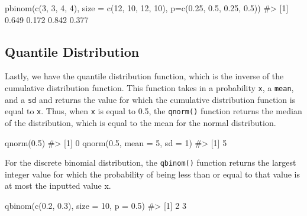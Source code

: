 \documentclass[
  letterpaper,
]{latex/krantz}
\makeatletter
\newenvironment{Shaded}{\begin{snugshade}}{\end{snugshade}}
\newcommand{\AttributeTok}[1]{\textcolor[rgb]{0.40,0.45,0.13}{#1}}
\newcommand{\CommentTok}[1]{\textcolor[rgb]{0.37,0.37,0.37}{#1}}
\newcommand{\DecValTok}[1]{\textcolor[rgb]{0.68,0.00,0.00}{#1}}
\newcommand{\FloatTok}[1]{\textcolor[rgb]{0.68,0.00,0.00}{#1}}
\newcommand{\FunctionTok}[1]{\textcolor[rgb]{0.28,0.35,0.67}{#1}}
\newcommand{\NormalTok}[1]{\textcolor[rgb]{0.00,0.23,0.31}{#1}}
\newenvironment{kframe}{%
\medskip{}
\setlength{\fboxsep}{.8em}
 \def\at@end@of@kframe{}%
 \ifinner\ifhmode%
  \def\at@end@of@kframe{\end{minipage}}%
  \begin{minipage}{\columnwidth}%
 \fi\fi%
 \def\FrameCommand##1{\hskip\@totalleftmargin \hskip-\fboxsep
 \colorbox{shadecolor}{##1}\hskip-\fboxsep
     \hskip-\linewidth \hskip-\@totalleftmargin \hskip\columnwidth}%
 \MakeFramed {\advance\hsize-\width
   \@totalleftmargin\z@ \linewidth\hsize
   \@setminipage}}%
 {\par\unskip\endMakeFramed%
 \at@end@of@kframe}
\renewenvironment{Shaded}{\begin{kframe}}{\end{kframe}}
\makeatother
\begin{document}
\begin{Shaded}
\begin{Highlighting}[]
\FunctionTok{pbinom}\NormalTok{(}\FunctionTok{c}\NormalTok{(}\DecValTok{3}\NormalTok{, }\DecValTok{3}\NormalTok{, }\DecValTok{4}\NormalTok{, }\DecValTok{4}\NormalTok{), }\AttributeTok{size =} \FunctionTok{c}\NormalTok{(}\DecValTok{12}\NormalTok{, }\DecValTok{10}\NormalTok{, }\DecValTok{12}\NormalTok{, }\DecValTok{10}\NormalTok{), }
       \AttributeTok{p=}\FunctionTok{c}\NormalTok{(}\FloatTok{0.25}\NormalTok{, }\FloatTok{0.5}\NormalTok{, }\FloatTok{0.25}\NormalTok{, }\FloatTok{0.5}\NormalTok{))}
\CommentTok{\#\textgreater{} [1] 0.649 0.172 0.842 0.377}
\end{Highlighting}
\end{Shaded}

\subsection{\texorpdfstring{Quantile Distribution
}{Quantile Distribution   }}\label{quantile-distribution}

Lastly, we have the quantile distribution function, which is the inverse
of the cumulative distribution function. This function takes in a
probability \texttt{x}, a \texttt{mean}, and a \texttt{sd} and returns
the value for which the cumulative distribution function is equal to
\texttt{x}. Thus, when \texttt{x} is equal to 0.5, the \texttt{qnorm()}
function returns the median of the distribution, which is equal to the
mean for the normal distribution.

\begin{Shaded}
\begin{Highlighting}[]
\FunctionTok{qnorm}\NormalTok{(}\FloatTok{0.5}\NormalTok{)}
\CommentTok{\#\textgreater{} [1] 0}
\FunctionTok{qnorm}\NormalTok{(}\FloatTok{0.5}\NormalTok{, }\AttributeTok{mean =} \DecValTok{5}\NormalTok{, }\AttributeTok{sd =} \DecValTok{1}\NormalTok{)}
\CommentTok{\#\textgreater{} [1] 5}
\end{Highlighting}
\end{Shaded}

For the discrete binomial distribution, the \texttt{qbinom()} function
returns the largest integer value for which the probability of being
less than or equal to that value is at most the inputted value x.

\begin{Shaded}
\begin{Highlighting}[]
\FunctionTok{qbinom}\NormalTok{(}\FunctionTok{c}\NormalTok{(}\FloatTok{0.2}\NormalTok{, }\FloatTok{0.3}\NormalTok{), }\AttributeTok{size =} \DecValTok{10}\NormalTok{, }\AttributeTok{p =} \FloatTok{0.5}\NormalTok{)}
\CommentTok{\#\textgreater{} [1] 2 3}
\end{Highlighting}
\end{Shaded}
\end{document}
